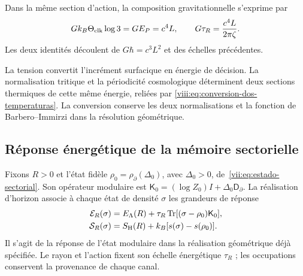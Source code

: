 Dans la même section d'action, la composition gravitationnelle s'exprime par
\begin{equation}
 Gk_B\Theta_{\rm clk}\log3=GE_P=c^4L,
 \qquad G\tau_R=\frac{c^4L}{2\pi\zeta}.
 \label{viii:eq:composicion-termica-gravitatoria}
\end{equation}
Les deux identités découlent de \(G\hbar=c^3L^2\) et des échelles précédentes.

La tension convertit l'incrément surfacique en énergie de décision.
La normalisation tritique et la périodicité cosmologique déterminent deux
sections thermiques de cette même énergie, reliées par
\eqref{viii:eq:conversion-dos-temperaturas}. La conversion conserve
les deux normalisations et la fonction de Barbero--Immirzi dans la résolution
géométrique.

\subsection{Réponse énergétique de la mémoire sectorielle}
\label{viii:subsec:respuesta-energetica-sectorial}

Fixons \(R>0\) et l'état fidèle
\(\rho_0=\rho_\partial(\Delta_0)\), avec \(\Delta_0>0\),
de~\eqref{vii:eq:estado-sectorial}. Son opérateur modulaire est
\(\mathsf K_0=(\log Z_0)I+\Delta_0\mathsf D_\partial\).
La réalisation d'horizon associe à chaque état de densité
\(\sigma\) les grandeurs de réponse
\begin{equation}
\begin{aligned}
 \mathcal E_R(\sigma)
 &=E_\Lambda(R)+\tau_R
   \operatorname{Tr}[(\sigma-\rho_0)\mathsf K_0],\\
 \mathcal S_R(\sigma)
 &=S_{\rm H}(R)+k_B[s(\sigma)-s(\rho_0)].
\end{aligned}
 \label{viii:eq:respuesta-horizonte-definida}
\end{equation}
Il s'agit de la réponse de l'état modulaire dans la réalisation géométrique déjà spécifiée. Le rayon et l'action fixent son échelle énergétique \(\tau_R\) ; les occupations conservent la provenance de chaque canal.

